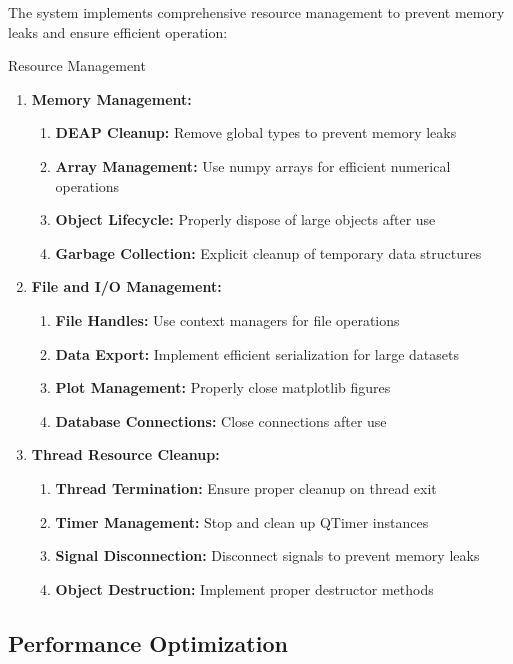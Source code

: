 \documentclass[12pt,a4paper]{article}
\begin{document}
The system implements comprehensive resource management to prevent memory leaks and ensure efficient operation:

\begin{algorithm}
\caption{Resource Management}
\begin{enumerate}
    \item \textbf{Memory Management:}
    \begin{enumerate}
        \item \textbf{DEAP Cleanup:} Remove global types to prevent memory leaks
        \item \textbf{Array Management:} Use numpy arrays for efficient numerical operations
        \item \textbf{Object Lifecycle:} Properly dispose of large objects after use
        \item \textbf{Garbage Collection:} Explicit cleanup of temporary data structures
    \end{enumerate}
    \item \textbf{File and I/O Management:}
    \begin{enumerate}
        \item \textbf{File Handles:} Use context managers for file operations
        \item \textbf{Data Export:} Implement efficient serialization for large datasets
        \item \textbf{Plot Management:} Properly close matplotlib figures
        \item \textbf{Database Connections:} Close connections after use
    \end{enumerate}
    \item \textbf{Thread Resource Cleanup:}
    \begin{enumerate}
        \item \textbf{Thread Termination:} Ensure proper cleanup on thread exit
        \item \textbf{Timer Management:} Stop and clean up QTimer instances
        \item \textbf{Signal Disconnection:} Disconnect signals to prevent memory leaks
        \item \textbf{Object Destruction:} Implement proper destructor methods
    \end{enumerate}
\end{enumerate}
\end{algorithm}

\subsection{Performance Optimization}
\end{document}
